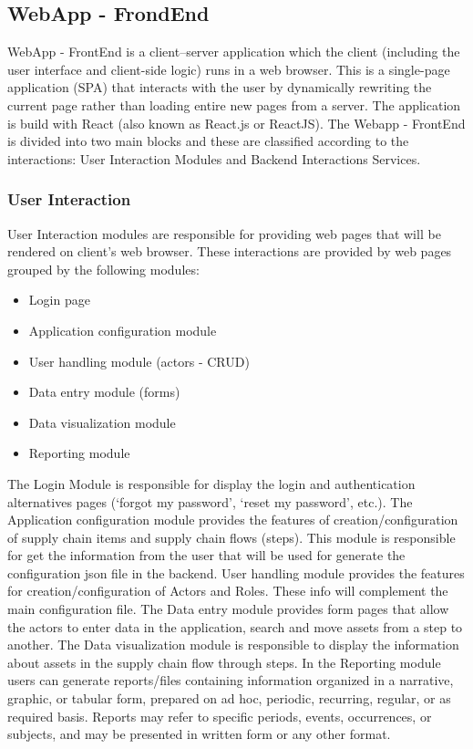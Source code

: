 \subsection{WebApp - FrondEnd}\label{sec:WebAppFrondEnd}
WebApp - FrontEnd is a client–server application which the client (including the user interface and client-side logic) runs in a web browser. This is a single-page application (SPA) that interacts with the user by dynamically rewriting the current page rather than loading entire new pages from a server. The application is build with React (also known as React.js or ReactJS). The Webapp - FrontEnd is divided into two main blocks and these are classified according to the interactions: User Interaction Modules and Backend Interactions Services.

\subsubsection{User Interaction}\label{sec:UserInteraction}
User Interaction modules are responsible for providing web pages that will be rendered on client’s web browser. These interactions are provided by web pages grouped by the following modules:

\begin{itemize}
\item Login page
\item Application configuration module
\item User handling module (actors - CRUD)
\item Data entry module (forms)
\item Data visualization module
\item Reporting module
\end{itemize}

The Login Module is responsible for display the login and authentication alternatives pages (‘forgot my password’, ‘reset my password’, etc.). The Application configuration module provides the features of creation/configuration of supply chain items and supply chain flows (steps). This module is responsible for get the information from the user that will be used for generate the configuration json file in the backend. User handling module provides the features for creation/configuration of Actors and Roles. These info will complement the main configuration file. The Data entry module provides form pages that allow the actors to enter data in the application, search and move assets from a step to another. The Data visualization module is responsible to display the information about assets in the supply chain flow through steps. In the Reporting module users can generate reports/files containing information organized in a narrative, graphic, or tabular form, prepared on ad hoc, periodic, recurring, regular, or as required basis. Reports may refer to specific periods, events, occurrences, or subjects, and may be presented in written form or any other format.

